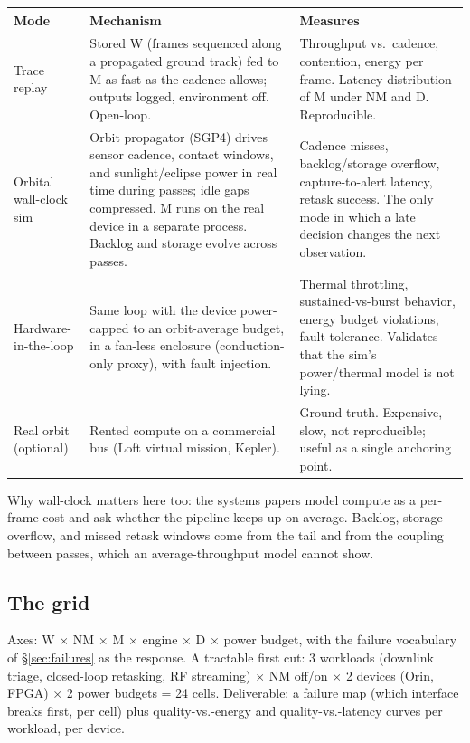 \documentclass[11pt]{article}
\begin{document}
\begin{center}
\small
\begin{tabularx}{\textwidth}{@{}P{2.6cm}LL@{}}
\toprule
\textbf{Mode} & \textbf{Mechanism} & \textbf{Measures} \\
\midrule
Trace replay & Stored W (frames sequenced along a propagated ground track) fed to M as fast as the
cadence allows; outputs logged, environment off. Open-loop. &
Throughput vs.\ cadence, contention, energy per frame. Latency distribution of M under NM and D.
Reproducible. \\
\addlinespace
Orbital wall-clock sim & Orbit propagator (SGP4) drives sensor cadence, contact windows, and
sunlight/eclipse power in real time during passes; idle gaps compressed. M runs on the real device in a
separate process. Backlog and storage evolve across passes. &
Cadence misses, backlog/storage overflow, capture-to-alert latency, retask success. The only mode in
which a late decision changes the next observation. \\
\addlinespace
Hardware-in-the-loop & Same loop with the device power-capped to an orbit-average budget, in a
fan-less enclosure (conduction-only proxy), with fault injection. &
Thermal throttling, sustained-vs-burst behavior, energy budget violations, fault tolerance.
Validates that the sim's power/thermal model is not lying. \\
\addlinespace
Real orbit (optional) & Rented compute on a commercial bus (Loft virtual mission, Kepler). &
Ground truth. Expensive, slow, not reproducible; useful as a single anchoring point. \\
\bottomrule
\end{tabularx}
\end{center}

Why wall-clock matters here too: the systems papers model compute as a per-frame cost and ask whether
the pipeline keeps up on average. Backlog, storage overflow, and missed retask windows come from the tail
and from the coupling between passes, which an average-throughput model cannot show.

\subsection{The grid}

Axes: W $\times$ NM $\times$ M $\times$ engine $\times$ D $\times$ power budget, with the failure
vocabulary of \S\ref{sec:failures} as the response. A tractable first cut: 3 workloads (downlink triage,
closed-loop retasking, RF streaming) $\times$ NM off/on $\times$ 2 devices (Orin, FPGA) $\times$ 2 power
budgets = 24 cells. Deliverable: a failure map (which interface breaks first, per cell) plus
quality-vs.-energy and quality-vs.-latency curves per workload, per device.
\end{document}
